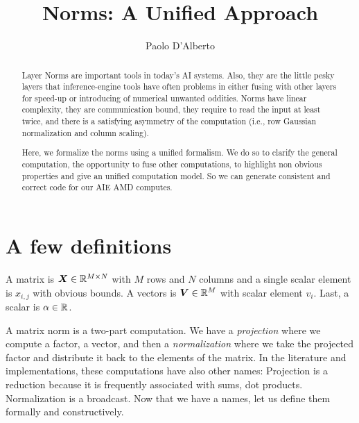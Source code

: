 \documentclass[acmsmall]{acmart}
\begin{document}
\title{Norms: A Unified Approach}

\author{Paolo D'Alberto}
\email{}

\renewcommand{\shortauthors}{D'Alberto et al.}

\begin{abstract}

  Layer Norms are important tools in today's AI systems.  Also, they
  are the little pesky layers that inference-engine tools have often
  problems in either fusing with other layers for speed-up or
  introducing of numerical unwanted oddities.  Norms have linear
  complexity, they are communication bound, they require to read the
  input at least twice, and there is a satisfying asymmetry of the
  computation (i.e., row Gaussian normalization and column scaling).
  
  Here, we formalize the norms using a unified formalism. We do so to
  clarify the general computation, the opportunity to fuse other
  computations, to highlight non obvious properties and give an
  unified computation model. So we can generate consistent and correct
  code for our AIE AMD computes.
  
\end{abstract}

\maketitle

\section{A few  definitions} 
\label{sec:introduction}

A matrix is ${\boldsymbol X} \in \mathbb{R}^{M \times N}$ with $M$ rows and $N$ columns
and a single scalar element is $x_{i,j}$ with obvious bounds. A
vectors is ${\boldsymbol V} \in \mathbb{R}^{M}$ with scalar element $v_i$.  Last, a
scalar is $\alpha \in \mathbb{R}$.


A matrix norm is a two-part computation. We have a {\em projection}
where we compute a factor, a vector, and then a {\em normalization}
where we take the projected factor and distribute it back to the
elements of the matrix. In the literature and implementations, these
computations have also other names: Projection is a reduction because
it is frequently associated with sums, dot products. Normalization is
a broadcast. Now that we have a names, let us define them formally and
constructively.
\end{document}
